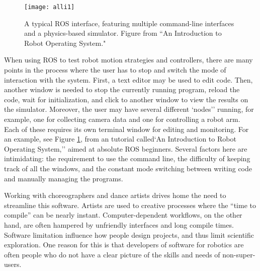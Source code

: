 \documentclass[arts,article,submit,moreauthors,pdftex,10pt,a4paper]{mdpi}
\begin{document}
\begin{figure}[h!]
\centering
\vspace{-.1in}
\texttt{[image: alli1]}
\caption{A typical ROS interface, featuring multiple command-line interfaces
and a physics-based simulator. Figure from ``An Introduction to Robot Operating
System."}
\label{alli1}
\end{figure}


When using ROS to test robot motion strategies and controllers, there are many
points in the process where the user has to stop and switch the mode of
interaction with the system. First, a text editor may be used to edit code.
Then, another window is needed to stop the currently running program, reload the
code, wait for initialization, and click to another window to view the results
on the simulator. Moreover, the user may have several different
`nodes'' running, for example, one for collecting camera data and one for controlling a robot arm. Each of these requires its own terminal window for editing and monitoring. For an example, see Figure \ref{alli1}, from an tutorial called`An
Introduction to Robot Operating System,'' aimed at absolute ROS beginners.
Several factors here are intimidating: the requirement to use the command line,
the difficulty of keeping track of all the windows, and the constant mode
switching between writing code and manually managing the programs.

Working with choreographers and dance artists drives home the need to streamline
this software. Artists are used to creative processes where the ``time to compile'' can be nearly
instant. Computer-dependent workflows, on the other hand, are often hampered by
unfriendly interfaces and long compile times.
Software limitation influence how people design projects, and
thus limit scientific exploration. One reason for this is that developers of software for robotics are often
people who do not have a clear picture of the skills and needs of
non-super-users. 
\end{document}
